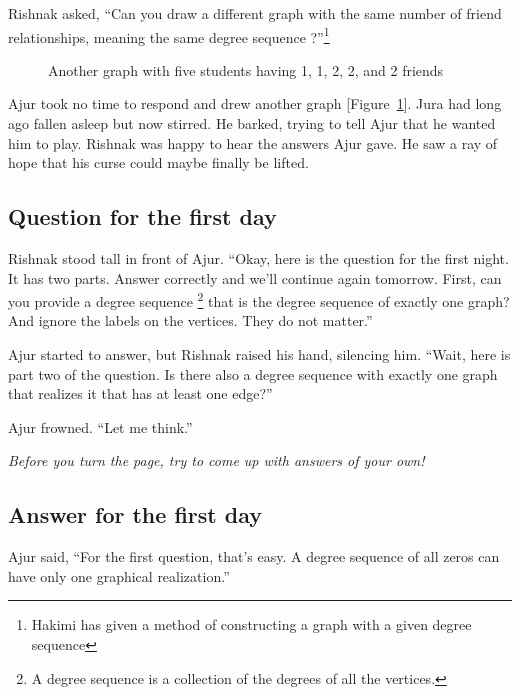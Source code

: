 Rishnak asked, ``Can you draw a different graph with the same number of friend relationships, meaning the same degree sequence  ?''\footnote{Hakimi has given a method of constructing a graph with a given degree sequence }

\begin{figure}
\begin{center}
\caption{Another graph with five students having 1, 1, 2, 2, and 2 friends}\label{dg4}
\end{center}
\end{figure}

Ajur took no time to respond and drew another graph [Figure~\ref{dg4}].
Jura had long ago fallen asleep but now stirred. He barked, trying to tell Ajur that he wanted him to play. Rishnak was happy to hear the answers Ajur gave. He saw a ray of hope that his curse could maybe finally be lifted.

\subsection*{Question for the first day}
Rishnak stood tall in front of Ajur.  ``Okay, here is the question for the first night.  It has two parts.  Answer correctly and we'll continue again tomorrow. First, can you provide a degree sequence \footnote{A degree sequence is a collection of the degrees of all the vertices.} that is the degree sequence of exactly one graph? And ignore the labels on the vertices. They do not matter.''

Ajur started to answer, but Rishnak raised his hand, silencing him.  ``Wait, here is part two of the question. Is there also a degree sequence with exactly one graph that realizes it that has at least one edge?''

Ajur frowned.  ``Let me think.''

\textit{Before you turn the page, try to come up with answers of your own!}

\newpage
\subsection*{Answer for the first day}
Ajur said, ``For the first question, that's easy.  A degree sequence of all zeros can have only one graphical realization.''

